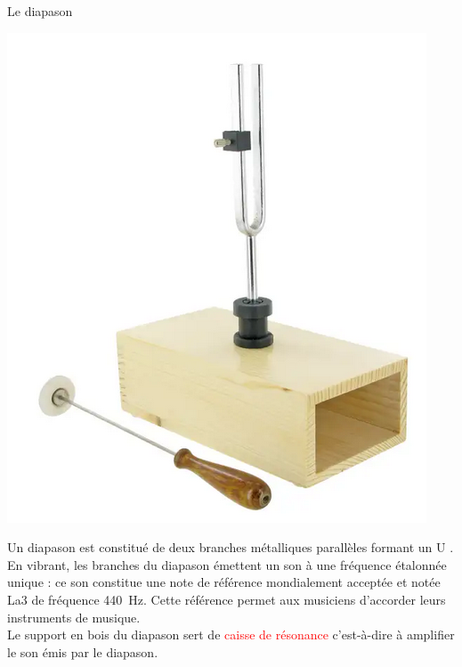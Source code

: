 \begin{doc}{Le diapason}
\begin{center}
\vspace{-0.5cm}
     \includegraphics[scale=0.5]{Images/Diapason.PNG}
\end{center}
Un diapason est constitué de deux branches métalliques parallèles formant un \og U \fg. En vibrant, les branches du diapason émettent un son à une fréquence étalonnée unique : ce son constitue une note de référence mondialement acceptée et notée La3 de fréquence 440~Hz. Cette référence permet aux musiciens d'accorder leurs instruments de musique.\\
Le support en bois du diapason sert de \textcolor{red}{caisse de résonance} c'est-à-dire à amplifier le son émis par le diapason.
\end{doc}

